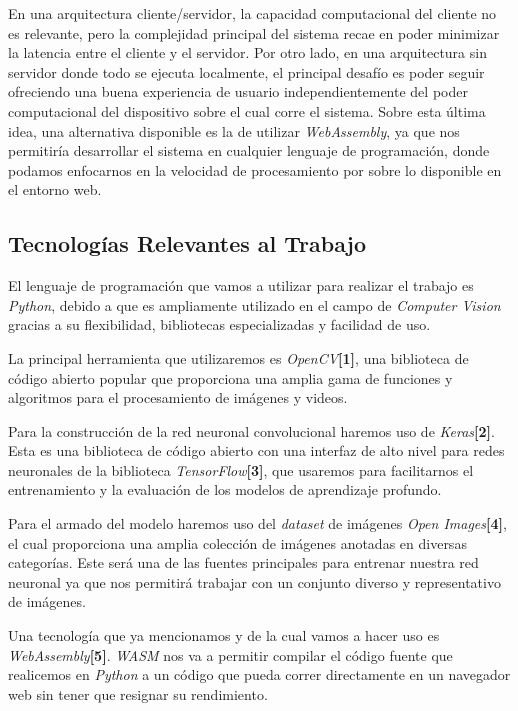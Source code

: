 \documentclass[a4paper]{article}
\begin{document}
En una arquitectura cliente/servidor, la capacidad computacional del cliente no es relevante, pero la complejidad principal del sistema recae en poder minimizar la latencia entre el cliente y el servidor. Por otro lado, en una arquitectura sin servidor donde todo se ejecuta localmente, el principal desafío es poder seguir ofreciendo una buena experiencia de usuario independientemente del poder computacional del dispositivo sobre el cual corre el sistema. Sobre esta última idea, una alternativa disponible es la de utilizar \emph{WebAssembly}, ya que nos permitiría desarrollar el sistema en cualquier lenguaje de programación, donde podamos enfocarnos en la velocidad de procesamiento por sobre lo disponible en el entorno web.

\subsection{Tecnologías Relevantes al Trabajo}
El lenguaje de programación que vamos a utilizar para realizar el trabajo es \emph{Python}, debido a que es ampliamente utilizado en el campo de \emph{Computer Vision} gracias a su flexibilidad, bibliotecas especializadas y facilidad de uso.

La principal herramienta que utilizaremos es \emph{OpenCV}\textbf{[1]}, una biblioteca de código abierto popular que proporciona una amplia gama de funciones y algoritmos para el procesamiento de imágenes y videos.

Para la construcción de la red neuronal convolucional haremos uso de \emph{Keras}\textbf{[2]}. Esta es una biblioteca de código abierto con una interfaz de alto nivel para redes neuronales de la biblioteca \emph{TensorFlow}\textbf{[3]}, que usaremos para facilitarnos el entrenamiento y la evaluación de los modelos de aprendizaje profundo.

Para el armado del modelo haremos uso del \emph{dataset} de imágenes \emph{Open Images}\textbf{[4]}, el cual proporciona una amplia colección de imágenes anotadas en diversas categorías. Este será una de las fuentes principales para entrenar nuestra red neuronal ya que nos permitirá trabajar con un conjunto diverso y representativo de imágenes.

Una tecnología que ya mencionamos y de la cual vamos a hacer uso es \emph{WebAssembly}\textbf{[5]}. \emph{WASM} nos va a permitir compilar el código fuente que realicemos en \emph{Python} a un código que pueda correr directamente en un navegador web sin tener que resignar su rendimiento.
\end{document}
